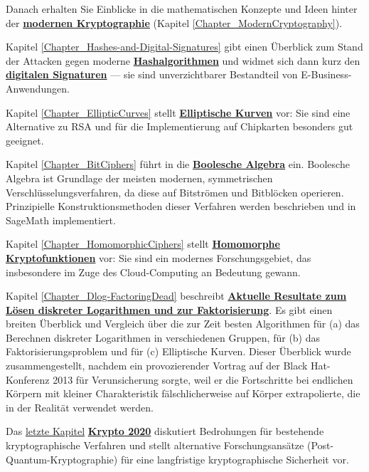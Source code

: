 Danach erhalten Sie Einblicke in die mathematischen Konzepte und
Ideen hinter der \hyperlink{Chapter_ModernCryptography}{\textbf{modernen Kryptographie}}
(Kapitel \ref{Chapter_ModernCryptography}).

Kapitel \ref{Chapter_Hashes-and-Digital-Signatures} gibt einen Überblick zum Stand der
Attacken gegen moderne \hyperlink{Chapter_Hashes-and-Digital-Signatures}\textbf{Hashalgorithmen}
und widmet sich dann kurz den \hyperlink{Chapter_Hashes-and-Digital-Signatures}\textbf{digitalen Signaturen}
--- sie sind unverzichtbarer Bestandteil von E-Business-Anwendungen.

Kapitel \ref{Chapter_EllipticCurves} stellt \hyperlink{Chapter_EllipticCurves}
\textbf{Elliptische Kurven} vor: Sie sind eine Alternative zu RSA und für die
Implementierung auf Chipkarten besonders gut geeignet.

Kapitel \ref{Chapter_BitCiphers} führt in die \hyperlink{Chapter_BitCiphers}\textbf{Boolesche Algebra} ein.
Boolesche Algebra ist Grundlage der meisten modernen, symmetrischen
Verschlüsselungsverfahren, da diese auf Bitströmen und Bitblöcken operieren.
Prinzipielle Konstruktionsmethoden dieser Verfahren werden beschrieben
und in SageMath implementiert.

Kapitel \ref{Chapter_HomomorphicCiphers} stellt
\hyperlink{Chapter_HomomorphicCiphers}\textbf{Homomorphe Kryptofunktionen}
vor: Sie sind ein modernes Forschungsgebiet, das insbesondere im Zuge des
Cloud-Computing an Bedeutung gewann.

Kapitel \ref{Chapter_Dlog-FactoringDead} beschreibt
\hyperlink{Chapter_Dlog-FactoringDead}\textbf{Aktuelle
Resultate zum Lösen diskreter Logarithmen und zur Faktorisierung}.
Es gibt einen breiten Überblick und Vergleich über die zur Zeit besten
Algorithmen für (a) das Berechnen diskreter Logarithmen in
verschiedenen Gruppen, für (b) das Faktorisierungsproblem und
für (c) Elliptische Kurven. Dieser Überblick wurde zusammengestellt,
nachdem ein provozierender Vortrag auf der Black Hat-Konferenz
2013 für Verunsicherung sorgte, weil er die Fortschritte bei endlichen
Körpern mit kleiner Charakteristik fälschlicherweise auf Körper
extrapolierte, die in der Realität verwendet werden.

Das \hyperlink{Chapter_Crypto2020}{letzte Kapitel}
\hyperlink{Chapter_Crypto2020}\textbf{Krypto 2020}
diskutiert Bedrohungen für bestehende kryptographische Verfahren und
stellt alternative Forschungsansätze (Post-Quantum-Kryptographie)
für eine langfristige kryptographische Sicherheit vor.

